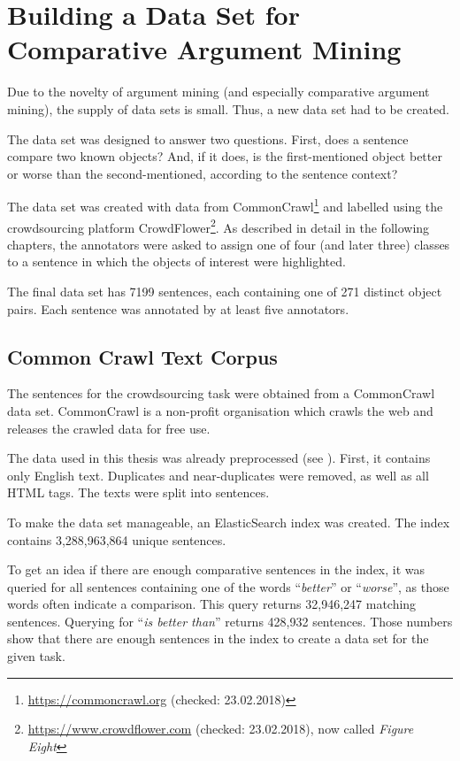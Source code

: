 \FloatBarrier
\chapter{Building a Data Set for Comparative Argument Mining}
\label{chp:dataset}
\label{sec:prestudy}
Due to the novelty of argument mining (and especially comparative argument mining), the supply of data sets is small. Thus, a new data set had to be created.

The data set was designed to answer two questions. First, does a sentence compare two known objects? And, if it does, is the first-mentioned object better or worse than the second-mentioned, according to the sentence context?

The data set was created with data from CommonCrawl\footnote{\url{https://commoncrawl.org} (checked: 23.02.2018)}  and labelled using the crowdsourcing platform CrowdFlower\footnote{\url{https://www.crowdflower.com} (checked: 23.02.2018), now called \emph{Figure Eight}}. As described in detail in the following chapters, the annotators were asked to assign one of four (and later three) classes to a sentence in which the objects of interest were highlighted.

The final data set has 7199 sentences, each containing one of 271 distinct object pairs. Each sentence was annotated by at least five annotators.

\section{Common Crawl Text Corpus}
The sentences for the crowdsourcing task were obtained from a CommonCrawl data set. CommonCrawl is a non-profit organisation which crawls the web and releases the crawled data for free use.

The data used in this thesis was already preprocessed (see \cite{Panchenko:2017aa}). First, it contains only English text. Duplicates and near-duplicates were removed, as well as all HTML tags. The texts were split into sentences.

To make the data set manageable, an ElasticSearch index was created. The index contains 3,288,963,864 unique sentences.

To get an idea if there are enough comparative sentences in the index, it was queried for all sentences containing one of the words \enquote{\emph{better}} or \enquote{\emph{worse}},  as those words often indicate a comparison. This query returns 32,946,247 matching sentences. Querying for \enquote{\emph{is better than}} returns 428,932 sentences. Those numbers show that there are enough sentences in the index to create a data set for the given task.



